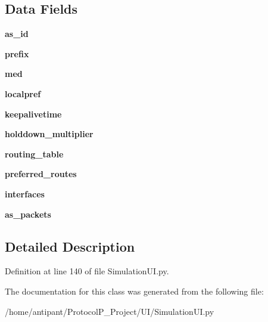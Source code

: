 \subsection*{Data Fields}
\begin{DoxyCompactItemize}
\item 
\hypertarget{classSimulationUI_1_1Router_a0528a974c501865a9fc4ae0de97059ec}{{\bfseries as\-\_\-id}}\label{classSimulationUI_1_1Router_a0528a974c501865a9fc4ae0de97059ec}

\item 
\hypertarget{classSimulationUI_1_1Router_a7b786a8920a3775c01bee6edbba68e12}{{\bfseries prefix}}\label{classSimulationUI_1_1Router_a7b786a8920a3775c01bee6edbba68e12}

\item 
\hypertarget{classSimulationUI_1_1Router_abc6e1e2d58302e84b625d8d3a3120a98}{{\bfseries med}}\label{classSimulationUI_1_1Router_abc6e1e2d58302e84b625d8d3a3120a98}

\item 
\hypertarget{classSimulationUI_1_1Router_a3ac910461b748bd15517295f37c73341}{{\bfseries localpref}}\label{classSimulationUI_1_1Router_a3ac910461b748bd15517295f37c73341}

\item 
\hypertarget{classSimulationUI_1_1Router_ac42ea738601caee57973bec3974499ea}{{\bfseries keepalivetime}}\label{classSimulationUI_1_1Router_ac42ea738601caee57973bec3974499ea}

\item 
\hypertarget{classSimulationUI_1_1Router_a597e06c99e66f2e2220e668c9b3f8f7a}{{\bfseries holddown\-\_\-multiplier}}\label{classSimulationUI_1_1Router_a597e06c99e66f2e2220e668c9b3f8f7a}

\item 
\hypertarget{classSimulationUI_1_1Router_a897286ad76eaef415be7dc868d9ec98d}{{\bfseries routing\-\_\-table}}\label{classSimulationUI_1_1Router_a897286ad76eaef415be7dc868d9ec98d}

\item 
\hypertarget{classSimulationUI_1_1Router_a9d2c8c63c2d6b526fbaee2a58e0ae356}{{\bfseries preferred\-\_\-routes}}\label{classSimulationUI_1_1Router_a9d2c8c63c2d6b526fbaee2a58e0ae356}

\item 
\hypertarget{classSimulationUI_1_1Router_a5b0f69ab3a6e037d5420352fef3869dc}{{\bfseries interfaces}}\label{classSimulationUI_1_1Router_a5b0f69ab3a6e037d5420352fef3869dc}

\item 
\hypertarget{classSimulationUI_1_1Router_a6747bb14d2b9e0a440b4023eb76d3dbe}{{\bfseries as\-\_\-packets}}\label{classSimulationUI_1_1Router_a6747bb14d2b9e0a440b4023eb76d3dbe}

\end{DoxyCompactItemize}


\subsection{Detailed Description}


Definition at line 140 of file Simulation\-U\-I.\-py.



The documentation for this class was generated from the following file\-:\begin{DoxyCompactItemize}
\item 
/home/antipant/\-Protocol\-P\-\_\-\-Project/\-U\-I/Simulation\-U\-I.\-py\end{DoxyCompactItemize}
